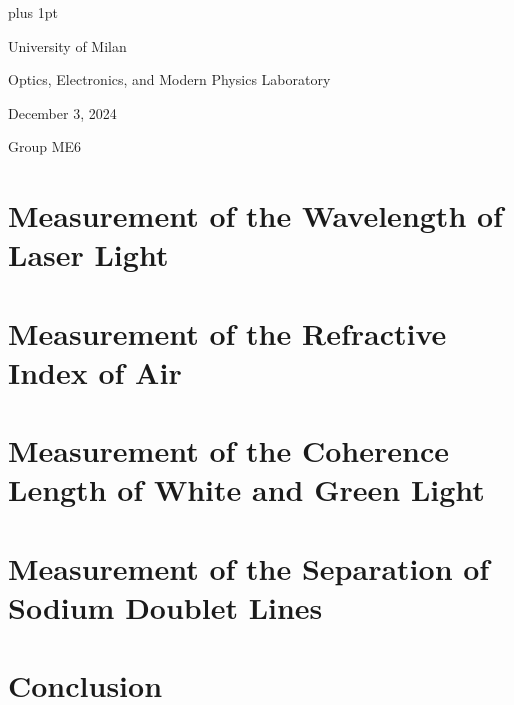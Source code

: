 \documentclass[a4paper,12pt]{article}
\begin{document}
\parskip=10pt plus 1pt
\parindent=0pt

\begin{center}
    University of Milan

\par{\Large{Optics, Electronics, and Modern Physics Laboratory}}  


December 3, 2024 

Group ME6
\par


\end{center}


\section{Measurement of the Wavelength of Laser Light}




\section{Measurement of the Refractive Index of Air }




\section{Measurement of the Coherence Length of White and Green Light}


\section{Measurement of the Separation of Sodium Doublet Lines}


\section{Conclusion}

\end{document}
